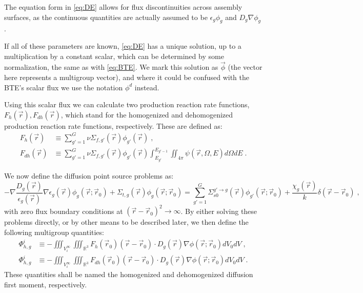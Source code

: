 \documentclass[a4paper,letterpaper,12pt,oneside,draft]{article}
\newcommand{\eec}{\;,}
\newcommand{\eep}{\;.}
\newcommand{\allspace}{\ensuremath{\mathbb{R}^3}}
\newcommand{\intg}[2][g]{\ensuremath{\int_{E_{#1}}^{E_{#1-1}} #2 dE}}
\newcommand{\vr}{\ensuremath{\vec{r}}}
\newcommand{\dvr}{\left(\vr-\vr_0\right)}
\begin{document}
    The equation form in \cref{eq:DE} allows for flux discontinuities across assembly surfaces, as the continuous quantities are actually assumed to be $\epsilon_g\phi_g$ and $D_g\nabla\phi_g$.
    
    If all of these parameters are known, \cref{eq:DE} has a unique solution, up to a multiplication by a constant scalar, which can be determined by some normalization, the same as with \cref{eq:BTE}.
    We mark this solution as $\vec{\phi}$ (the vector here represents a multigroup vector), and where it could be confused with the BTE's scalar flux we use the notation $\phi^d$ instead.
    
    Using this scalar flux we can calculate two production reaction rate functions, $F_h(\vr),F_{dh}(\vr)$, which stand for the homogenized and dehomogenized production reaction rate functions, respectively. These are defined as:
    \begin{align}
    \label{def:Fh}
        F_h(\vr) &\equiv \sum_{g'=1}^G\nu\Sigma_{f,g'}(\vr)\phi_{g'}(\vr) \eec\\
    \label{def:Fdh}
        F_{dh}(\vr) &\equiv \sum_{g'=1}^G\nu\Sigma_{f,g'}(\vr)\phi_{g'}(\vr)\intg[g']{\iint_{4\pi}\psi(\vr,\Omega,E)d\Omega}\eep
    \end{align}
    
    We now define the diffusion point source problems as:
    \begin{equation}
    \label{eq:DE:PS}
        -\nabla \frac{D_g(\vr)}{\epsilon_g(\vr)}\nabla\epsilon_g(\vr)\phi_g(\vr;\vr_0) +
        \Sigma_{t,g}(\vr)\phi_g(\vr;\vr_0) = 
        \sum_{g'=1}^G \Sigma_{s0}^{g'\to g}(\vr)\phi_{g'}(\vr;\vr_0) + \frac{\chi_g(\vr)}{k}\delta\dvr\eec
    \end{equation}
    with zero flux boundary conditions at $\dvr^2\to\infty$.
    By either solving these problems directly, or by other means to be described later, we then define the following multigroup quantities:
    \begin{align}
    \label{def:PhiH}
        \Phi_{h,g}^i &\equiv -\iiint_{V_i^\infty}\iiint_{\allspace}F_h(\vr_0)\dvr\cdot D_g(\vr)\nabla\phi(\vr;\vr_0)dV_0dV \eec\\
    \label{def:PhiDH}
        \Phi_{h,g}^i &\equiv -\iiint_{V_i^\infty}\iiint_{\allspace}F_{dh}(\vr_0)\dvr\cdot D_g(\vr)\nabla\phi(\vr;\vr_0)dV_0dV\eep
    \end{align}
    These quantities shall be named the homogenized and dehomogenized diffusion first moment, respectively.
    
\end{document}
